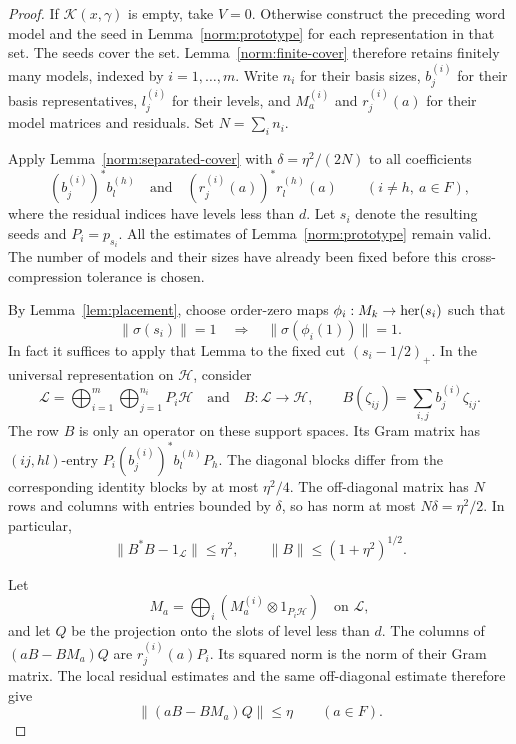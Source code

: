 \begin{proof}
If \(\mathcal K(x,\gamma)\) is empty, take \(V=0\).  Otherwise
construct the preceding word model and the seed in
Lemma~\ref{norm:prototype} for each representation in that set.
The seeds cover the set.  Lemma~\ref{norm:finite-cover} therefore
retains finitely many models, indexed by \(i=1,\ldots,m\).
Write \(n_i\) for their basis sizes,
\(b_j^{(i)}\) for their basis representatives, \(l_j^{(i)}\) for
their levels, and \(M_a^{(i)}\) and \(r_j^{(i)}(a)\) for their
model matrices and residuals.  Set \(N=\sum_i n_i\).

Apply Lemma~\ref{norm:separated-cover} with
\(\delta=\eta^2/(2N)\) to all coefficients
\[
 (b_j^{(i)})^*b_l^{(h)}
 \quad\text{and}\quad
 (r_j^{(i)}(a))^*r_l^{(h)}(a)
 \qquad(i\ne h,\ a\in F),
\]
where the residual indices have levels less than \(d\).
Let \(s_i\) denote the resulting seeds and \(P_i=p_{s_i}\).
All the estimates of Lemma~\ref{norm:prototype} remain valid.
The number of models and their sizes have already been fixed
before this cross-compression tolerance is chosen.

By Lemma~\ref{lem:placement}, choose \cpc order-zero maps
\(\phi_i:M_k\to\operatorname{her}(s_i)\) such that
\begin{equation}\label{norm:cone-norm-one}
 \|\sigma(s_i)\|=1\quad\Longrightarrow\quad
 \|\sigma(\phi_i(1))\|=1.
\end{equation}
In fact it suffices to apply that Lemma to the fixed cut
\((s_i-1/2)_+\).  In the universal representation on
\(\mathcal H\), consider
\[
 \mathcal L=\bigoplus_{i=1}^m\bigoplus_{j=1}^{n_i}P_i\mathcal H
 \quad\text{and}\quad
 B:\mathcal L\to\mathcal H,\qquad
 B(\zeta_{ij})=\sum_{i,j}b_j^{(i)}\zeta_{ij}.
\]
The row \(B\) is only an operator on these support spaces.
Its Gram matrix has \((ij,hl)\)-entry
\(P_i(b_j^{(i)})^*b_l^{(h)}P_h\).
The diagonal blocks differ from the corresponding identity blocks
by at most \(\eta^2/4\).  The off-diagonal matrix has \(N\) rows
and columns with entries bounded by \(\delta\), so has norm at most
\(N\delta=\eta^2/2\).  In particular,
\begin{equation}\label{norm:row-gram}
 \|B^*B-1_{\mathcal L}\|\le\eta^2,\qquad
 \|B\|\le(1+\eta^2)^{1/2}.
\end{equation}

Let
\[
 M_a=\bigoplus_i(M_a^{(i)}\otimes1_{P_i\mathcal H})
       \quad\text{on }\mathcal L,
\]
and let \(Q\) be the projection onto the slots of level less than
\(d\).  The columns of \((aB-BM_a)Q\) are
\(r_j^{(i)}(a)P_i\).  Its squared norm is the norm of their Gram
matrix.  The local residual estimates and the same off-diagonal
estimate therefore give
\begin{equation}\label{norm:row-residual}
 \|(aB-BM_a)Q\|\le\eta\qquad(a\in F).
\end{equation}


\end{proof}

